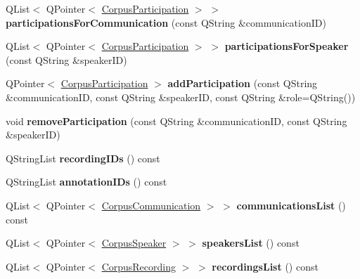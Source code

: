 \begin{DoxyCompactItemize}
Q\+List$<$ Q\+Pointer$<$ \hyperlink{class_corpus_participation}{Corpus\+Participation} $>$ $>$ {\bfseries participations\+For\+Communication} (const Q\+String \&communication\+ID)
\item 
\mbox{\label{class_corpus_adb290afffa993f7232932e9e7a6fe10e}} 
Q\+List$<$ Q\+Pointer$<$ \hyperlink{class_corpus_participation}{Corpus\+Participation} $>$ $>$ {\bfseries participations\+For\+Speaker} (const Q\+String \&speaker\+ID)
\item 
\mbox{\label{class_corpus_a1fdd32d24c55b4f9a477efdb68df52ad}} 
Q\+Pointer$<$ \hyperlink{class_corpus_participation}{Corpus\+Participation} $>$ {\bfseries add\+Participation} (const Q\+String \&communication\+ID, const Q\+String \&speaker\+ID, const Q\+String \&role=Q\+String())
\item 
\mbox{\label{class_corpus_ac1c54f5078d3eb9de6063c38e6fbb6e0}} 
void {\bfseries remove\+Participation} (const Q\+String \&communication\+ID, const Q\+String \&speaker\+ID)
\item 
\mbox{\label{class_corpus_aa1169b1871f4b115d012c7f2d6e703ce}} 
Q\+String\+List {\bfseries recording\+I\+Ds} () const
\item 
\mbox{\label{class_corpus_a11fb88253c81a672bc12a1fe11de1dc4}} 
Q\+String\+List {\bfseries annotation\+I\+Ds} () const
\item 
\mbox{\label{class_corpus_aea431975c8d338bb216ff5d47b114f10}} 
Q\+List$<$ Q\+Pointer$<$ \hyperlink{class_corpus_communication}{Corpus\+Communication} $>$ $>$ {\bfseries communications\+List} () const
\item 
\mbox{\label{class_corpus_af334c719b11e7de4ec00acc8d68ff895}} 
Q\+List$<$ Q\+Pointer$<$ \hyperlink{class_corpus_speaker}{Corpus\+Speaker} $>$ $>$ {\bfseries speakers\+List} () const
\item 
\mbox{\label{class_corpus_ac46407c550be94dee0483190d1c5dd08}} 
Q\+List$<$ Q\+Pointer$<$ \hyperlink{class_corpus_recording}{Corpus\+Recording} $>$ $>$ {\bfseries recordings\+List} () const
\item 
\mbox{\label{class_corpus_ad4f2b0f294d0bc936cfe0fdeb01df384}} 

\end{DoxyCompactItemize}
